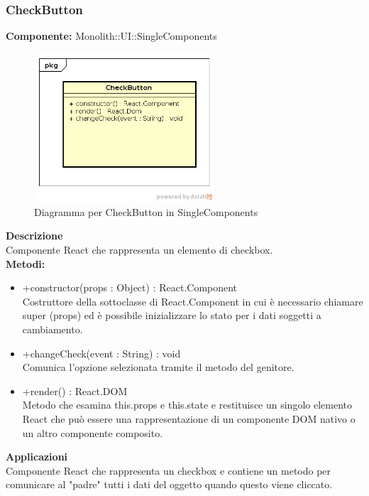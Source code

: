 \clearpage

\subsubsection{CheckButton}
\textbf{Componente:}  Monolith::UI::SingleComponents\\
   \FloatBarrier
   \begin{figure}[ht]
   \centering
   \includegraphics[width=0.6\textwidth]{img/single-CheckButton.png}
   \caption{{Diagramma per CheckButton in SingleComponents}}
\end{figure}
\FloatBarrier
\textbf{Descrizione}\\
Componente React che rappresenta un elemento di checkbox. \\
\textbf{Metodi:} 
\begin{itemize}

\item +constructor(props : Object) : React.Component 
\\
Costruttore della sottoclasse di React.Component in cui è necessario chiamare super (props) ed è possibile inizializzare lo stato per i dati soggetti a cambiamento.

\item +changeCheck(event : String) : void  
\\
Comunica l’opzione selezionata tramite il metodo del genitore. 

\item +render() : React.DOM 
\\
Metodo che esamina this.props e this.state e restituisce un singolo elemento React che può essere una rappresentazione di un componente DOM nativo o un altro componente composito.

\end{itemize} 


\textbf{Applicazioni}\\
Componente React che rappresenta un checkbox e contiene un metodo per comunicare al "padre" tutti i dati del oggetto quando questo viene cliccato. 


